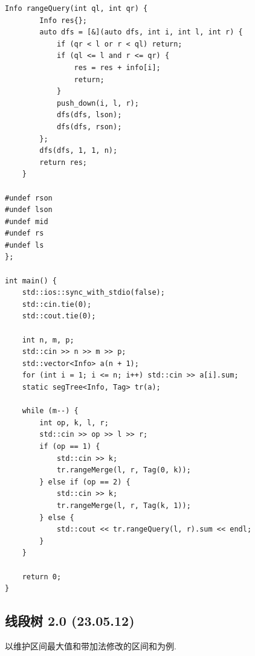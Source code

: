\documentclass[UTF8, a4paper, titlepage, twoside]{ctexart}
\begin{document}
\begin{lstlisting}[style = cpp]
    Info rangeQuery(int ql, int qr) {
        Info res{};
        auto dfs = [&](auto dfs, int i, int l, int r) {
            if (qr < l or r < ql) return;
            if (ql <= l and r <= qr) {
                res = res + info[i];
                return;
            }
            push_down(i, l, r);
            dfs(dfs, lson);
            dfs(dfs, rson);
        };
        dfs(dfs, 1, 1, n);
        return res;
    }

#undef rson
#undef lson
#undef mid
#undef rs
#undef ls
};

int main() {
    std::ios::sync_with_stdio(false);
    std::cin.tie(0);
    std::cout.tie(0);

    int n, m, p;
    std::cin >> n >> m >> p;
    std::vector<Info> a(n + 1);
    for (int i = 1; i <= n; i++) std::cin >> a[i].sum;
    static segTree<Info, Tag> tr(a);

    while (m--) {
        int op, k, l, r;
        std::cin >> op >> l >> r;
        if (op == 1) {
            std::cin >> k;
            tr.rangeMerge(l, r, Tag(0, k));
        } else if (op == 2) {
            std::cin >> k;
            tr.rangeMerge(l, r, Tag(k, 1));
        } else {
            std::cout << tr.rangeQuery(l, r).sum << endl;
        }
    }

    return 0;
}
\end{lstlisting}

\subsection{ 线段树 2.0 (23.05.12) }
以维护区间最大值和带加法修改的区间和为例.
\end{document}
